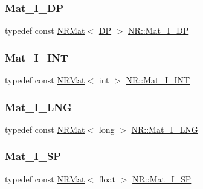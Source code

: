 \mbox{\label{namespaceNR_a2b8abfda8fffad6ba0a1b5a4c0773dbf}} 
\subsubsection{\texorpdfstring{Mat\_I\_DP}{Mat\_I\_DP}}
{\footnotesize\ttfamily typedef const \mbox{\hyperlink{classNR_1_1NRMat}{N\+R\+Mat}}$<$ \mbox{\hyperlink{namespaceNR_af6ff762dd605ff477b8e52387253a02a}{DP}} $>$ \mbox{\hyperlink{namespaceNR_a2b8abfda8fffad6ba0a1b5a4c0773dbf}{N\+R\+::\+Mat\+\_\+\+I\+\_\+\+DP}}}

\mbox{\label{namespaceNR_a1e59f4068736f6f8a60d68e927e65a08}} 
\subsubsection{\texorpdfstring{Mat\_I\_INT}{Mat\_I\_INT}}
{\footnotesize\ttfamily typedef const \mbox{\hyperlink{classNR_1_1NRMat}{N\+R\+Mat}}$<$ int $>$ \mbox{\hyperlink{namespaceNR_a1e59f4068736f6f8a60d68e927e65a08}{N\+R\+::\+Mat\+\_\+\+I\+\_\+\+I\+NT}}}

\mbox{\label{namespaceNR_a743683745c8482fdcc884b1c720724fc}} 
\subsubsection{\texorpdfstring{Mat\_I\_LNG}{Mat\_I\_LNG}}
{\footnotesize\ttfamily typedef const \mbox{\hyperlink{classNR_1_1NRMat}{N\+R\+Mat}}$<$ long $>$ \mbox{\hyperlink{namespaceNR_a743683745c8482fdcc884b1c720724fc}{N\+R\+::\+Mat\+\_\+\+I\+\_\+\+L\+NG}}}

\mbox{\label{namespaceNR_a061a8b183608807da47c75755802abfd}} 
\subsubsection{\texorpdfstring{Mat\_I\_SP}{Mat\_I\_SP}}
{\footnotesize\ttfamily typedef const \mbox{\hyperlink{classNR_1_1NRMat}{N\+R\+Mat}}$<$ float $>$ \mbox{\hyperlink{namespaceNR_a061a8b183608807da47c75755802abfd}{N\+R\+::\+Mat\+\_\+\+I\+\_\+\+SP}}}

